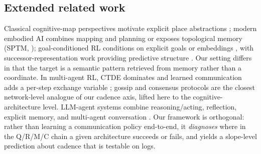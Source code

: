 \documentclass{article}
\begin{document}
\subsection{Extended related work}
\label{p1:app:related-work-extended}

Classical cognitive-map perspectives motivate explicit place abstractions \citep{tolman1948cognitive,okeefe1978hippocampus,kuipers2000spatial}; modern embodied AI combines mapping and planning \citep{gupta2017cognitive} or exposes topological memory (SPTM, \citealp{savinov2018semi}); goal-conditioned RL conditions on explicit goals or embeddings \citep{andrychowicz2017hindsight,ghosh2021learning}, with successor-representation work providing predictive structure \citep{dayan1993improving,stachenfeld2017hippocampus,momennejad2017successor}. Our setting differs in that the target is a semantic pattern retrieved from memory rather than a coordinate. In multi-agent RL, CTDE dominates \citep{lowe2017maddpg,foerster2018ctde} and learned communication adds a per-step exchange variable \citep{sukhbaatar2016commnet,foerster2016learning}; gossip and consensus protocols \citep{boyd2006gossip,xiao2007distributed} are the closest network-level analogue of our cadence axis, lifted here to the cognitive-architecture level. LLM-agent systems combine reasoning/acting, reflection, explicit memory, and multi-agent conversation \citep{yao2022react,shinn2023reflexion,wang2023voyager,park2023generative,wu2023autogen,packer2023memgpt,chhikara2025mem0}. Our framework is orthogonal: rather than learning a communication policy end-to-end, it \emph{diagnoses} where in the Q/R/M/C chain a given architecture succeeds or fails, and yields a slope-level prediction about cadence that is testable on logs.
\end{document}
